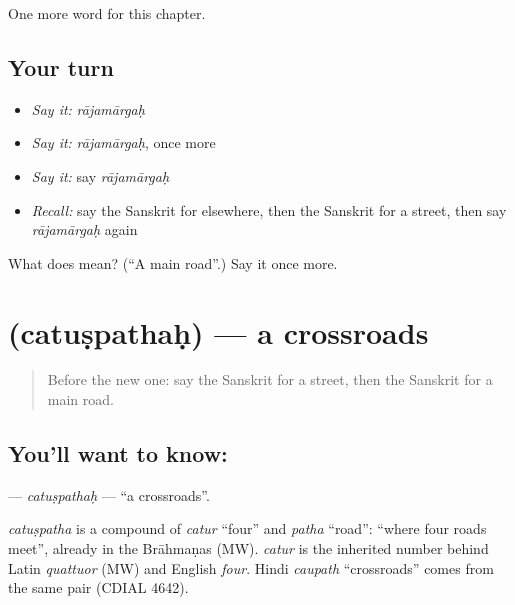 \begin{grammarlens}[title={What you've built}]
One more word for this chapter.
\end{grammarlens}

\subsection*{Your turn}
\begin{itemize}
\raggedright
  \item \emph{Say it:} \emph{rājamārgaḥ}
  \item \emph{Say it:} \emph{rājamārgaḥ}, once more
  \item \emph{Say it:} say \emph{rājamārgaḥ}
  \item \emph{Recall:} say the Sanskrit for elsewhere, then the Sanskrit for a street, then say \emph{rājamārgaḥ} again
\end{itemize}

\begin{tcolorbox}[breakable,colback=teal!4,colframe=teal!35!black,title={Before you move on}]
What does  mean? (\textquotedblleft{}A main road\textquotedblright{}.) Say it once more.
\end{tcolorbox}
\section[\texorpdfstring{\sk{चतुष्पथः} (catuṣpathaḥ)}{चतुष्पथः (catuṣpathaḥ)}]{ (catuṣpathaḥ) — a crossroads}

\label{lesson:SA-C96-catuspathah}



\begin{quote}
Before the new one: say the Sanskrit for a street, then the Sanskrit for a main road.
\end{quote}

\subsection*{You'll want to know: }
\textbf{} — \emph{catuṣpathaḥ} — \textquotedblleft{}a crossroads\textquotedblright{}.

\begin{cousinweb}
\emph{catuṣpatha} is a compound of \emph{catur} \textquotedblleft{}four\textquotedblright{} and \emph{patha} \textquotedblleft{}road\textquotedblright{}: \textquotedblleft{}where four roads meet\textquotedblright{}, already in the Brāhmaṇas (MW). \emph{catur} is the inherited number behind Latin \emph{quattuor} (MW) and English \emph{four}. Hindi \emph{caupath} \textquotedblleft{}crossroads\textquotedblright{} comes from the same pair (CDIAL 4642).
\end{cousinweb}

